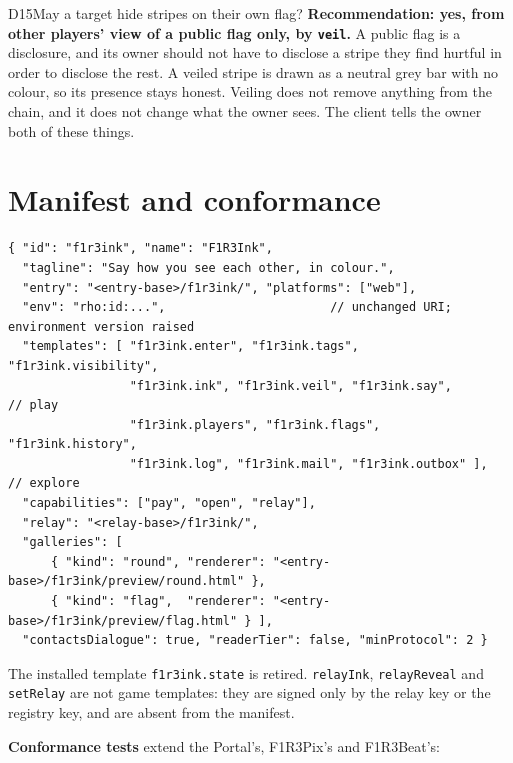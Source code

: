 \documentclass[11pt,a4paper]{article}
\newcommand{\code}[1]{\texttt{#1}}
\begin{document}
\begin{decision}{D15}{May a target hide stripes on their own flag?}
\textbf{Recommendation: yes, from other players' view of a public flag only, by \code{veil}.} A
public flag is a disclosure, and its owner should not have to disclose a stripe they find
hurtful in order to disclose the rest. A veiled stripe is drawn as a neutral grey bar with no
colour, so its presence stays honest. Veiling does not remove anything from the chain, and it
does not change what the owner sees. The client tells the owner both of these things.
\end{decision}

\section{Manifest and conformance}\label{sec:manifest}

\begin{lstlisting}
{ "id": "f1r3ink", "name": "F1R3Ink",
  "tagline": "Say how you see each other, in colour.",
  "entry": "<entry-base>/f1r3ink/", "platforms": ["web"],
  "env": "rho:id:...",                       // unchanged URI; environment version raised
  "templates": [ "f1r3ink.enter", "f1r3ink.tags", "f1r3ink.visibility",
                 "f1r3ink.ink", "f1r3ink.veil", "f1r3ink.say",          // play
                 "f1r3ink.players", "f1r3ink.flags", "f1r3ink.history",
                 "f1r3ink.log", "f1r3ink.mail", "f1r3ink.outbox" ],      // explore
  "capabilities": ["pay", "open", "relay"],
  "relay": "<relay-base>/f1r3ink/",
  "galleries": [
      { "kind": "round", "renderer": "<entry-base>/f1r3ink/preview/round.html" },
      { "kind": "flag",  "renderer": "<entry-base>/f1r3ink/preview/flag.html" } ],
  "contactsDialogue": true, "readerTier": false, "minProtocol": 2 }
\end{lstlisting}

The installed template \code{f1r3ink.state} is retired. \code{relayInk}, \code{relayReveal} and
\code{setRelay} are not game templates: they are signed only by the relay key or the registry
key, and are absent from the manifest.

\textbf{Conformance tests} extend the Portal's, F1R3Pix's and F1R3Beat's:
\end{document}
